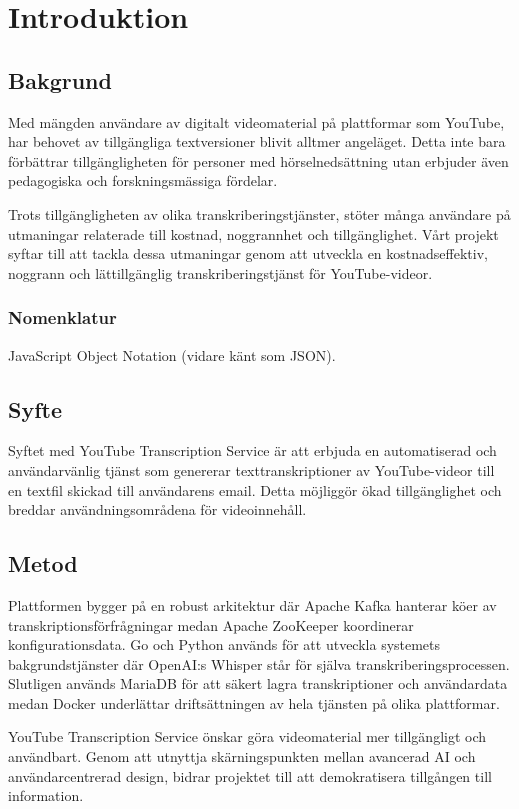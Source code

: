 \chapter{Introduktion}

\section{Bakgrund}
Med mängden användare av digitalt videomaterial på plattformar som YouTube, har behovet av tillgängliga textversioner blivit alltmer angeläget. Detta inte bara förbättrar tillgängligheten för personer med hörselnedsättning utan erbjuder även pedagogiska och forskningsmässiga fördelar.

Trots tillgängligheten av olika transkriberingstjänster, stöter många användare på utmaningar relaterade till kostnad, noggrannhet och tillgänglighet. Vårt projekt syftar till att tackla dessa utmaningar genom att utveckla en kostnadseffektiv, noggrann och lättillgänglig transkriberingstjänst för YouTube-videor.

\subsection{Nomenklatur}
JavaScript Object Notation (vidare känt som JSON).

\section{Syfte}
Syftet med YouTube Transcription Service är att erbjuda en automatiserad och användarvänlig tjänst som genererar texttranskriptioner av YouTube-videor till en textfil skickad till användarens email. Detta möjliggör ökad tillgänglighet och breddar användningsområdena för videoinnehåll.

\section{Metod}
Plattformen bygger på en robust arkitektur där Apache Kafka hanterar köer av transkriptionsförfrågningar medan Apache ZooKeeper koordinerar konfigurationsdata. Go och Python används för att utveckla systemets bakgrundstjänster där OpenAI:s Whisper står för själva transkriberingsprocessen. Slutligen används MariaDB för att säkert lagra transkriptioner och användardata medan Docker underlättar driftsättningen av hela tjänsten på olika plattformar.

YouTube Transcription Service önskar göra videomaterial mer tillgängligt och användbart. Genom att utnyttja skärningspunkten mellan avancerad AI och användarcentrerad design, bidrar projektet till att demokratisera tillgången till information.
